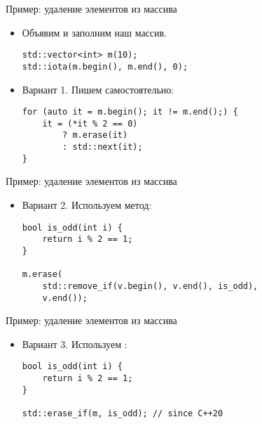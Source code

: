 \documentclass{beamer}
\begin{document}
\begin{frame}[fragile]{Пример: удаление элементов из массива}
    \begin{itemize}
        \item Объявим и заполним наш массив.
            \begin{lstlisting}
std::vector<int> m(10);
std::iota(m.begin(), m.end(), 0);
            \end{lstlisting}
        \item Вариант 1. Пишем самостоятельно:
            \begin{lstlisting}
for (auto it = m.begin(); it != m.end();) {
    it = (*it % 2 == 0)
        ? m.erase(it)
        : std::next(it);
}
            \end{lstlisting}
    \end{itemize}
\end{frame}

\begin{frame}[fragile]{Пример: удаление элементов из массива}
    \begin{itemize}
        \item Вариант 2. Используем метод:
            \begin{lstlisting}
bool is_odd(int i) {
    return i % 2 == 1;
}

m.erase(
    std::remove_if(v.begin(), v.end(), is_odd),
    v.end());
            \end{lstlisting}
    \end{itemize}
\end{frame}

\begin{frame}[fragile]{Пример: удаление элементов из массива}
    \begin{itemize}
        \item Вариант 3. Используем :
            \begin{lstlisting}
bool is_odd(int i) {
    return i % 2 == 1;
}

std::erase_if(m, is_odd); // since C++20
            \end{lstlisting}
    \end{itemize}
\end{frame}
\end{document}
